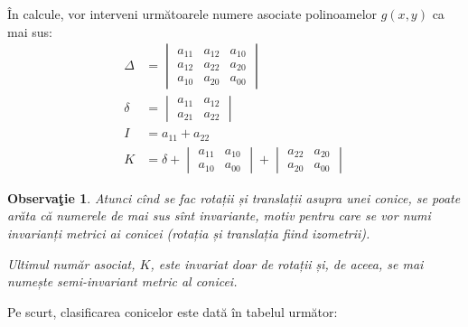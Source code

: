\documentclass[11pt,a4paper]{article}
\theoremstyle{dotless}
\theoremstyle{dotlessdr}
\newtheorem{remark}{Observa\c{t}ie}[section]
\begin{document}
În calcule, vor interveni următoarele numere asociate polinoamelor $g(x, y)$ ca
mai sus:
\begin{align*}
	\Delta &= \begin{vmatrix}
	              a_{11} & a_{12} & a_{10} \\
	              a_{12} & a_{22} & a_{20} \\
	              a_{10} & a_{20} & a_{00}
              \end{vmatrix} \\
    \delta &= \begin{vmatrix}
	              a_{11} & a_{12} \\
	              a_{21} & a_{22}
              \end{vmatrix} \\
    I &= a_{11} + a_{22} \\
    K &= \delta + \begin{vmatrix}
	                  a_{11} & a_{10} \\
	                  a_{10} & a_{00}
                  \end{vmatrix} + \begin{vmatrix}
	                                  a_{22} & a_{20} \\
	                                  a_{20} & a_{00}
                                  \end{vmatrix}
\end{align*}

\begin{remark}
	Atunci cînd se fac rotații și translații asupra unei conice, se poate arăta
că numerele de mai sus sînt invariante, motiv pentru care se vor numi 
\emph{invarianți metrici} ai conicei (rotația și translația fiind izometrii).

Ultimul număr asociat, $K$, este invariat doar de rotații și, de aceea, se mai
numește \emph{semi-invariant} metric al conicei.
\end{remark}

Pe scurt, clasificarea conicelor este dată în tabelul următor:
\end{document}
